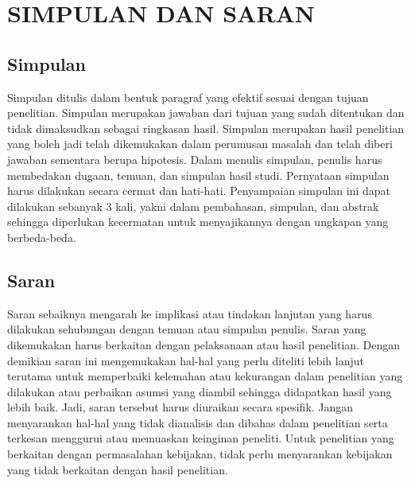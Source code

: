 
\chapter{SIMPULAN DAN SARAN}

\section{Simpulan}

Simpulan ditulis dalam bentuk paragraf yang efektif sesuai dengan tujuan
penelitian. Simpulan merupakan jawaban dari tujuan yang sudah ditentukan dan
tidak dimaksudkan sebagai ringkasan hasil. Simpulan merupakan hasil penelitian
yang boleh jadi telah dikemukakan dalam perumusan masalah dan telah diberi
jawaban sementara berupa hipotesis. Dalam menulis simpulan, penulis harus
membedakan dugaan, temuan, dan simpulan hasil studi. Pernyataan simpulan harus
dilakukan secara cermat dan hati-hati. Penyampaian simpulan ini dapat dilakukan
sebanyak 3 kali, yakni dalam pembahasan, simpulan, dan abstrak sehingga
diperlukan kecermatan untuk menyajikannya dengan ungkapan yang berbeda-beda.

\section{Saran}

Saran sebaiknya mengarah ke implikasi atau tindakan lanjutan yang harus
dilakukan sehubungan dengan temuan atau simpulan penulis. Saran yang
dikemukakan harus berkaitan dengan pelaksanaan atau hasil penelitian. Dengan
demikian saran ini mengemukakan hal-hal yang perlu diteliti lebih lanjut
terutama untuk memperbaiki kelemahan atau kekurangan dalam penelitian yang
dilakukan atau perbaikan asumsi yang diambil sehingga didapatkan hasil yang
lebih baik. Jadi, saran tersebut harus diuraikan secara spesifik. Jangan
menyarankan hal-hal yang tidak dianalisis dan dibahas dalam penelitian serta
terkesan menggurui atau memuaskan keinginan peneliti. Untuk penelitian yang
berkaitan dengan permasalahan kebijakan, tidak perlu menyarankan kebijakan yang
tidak berkaitan dengan hasil penelitian.
